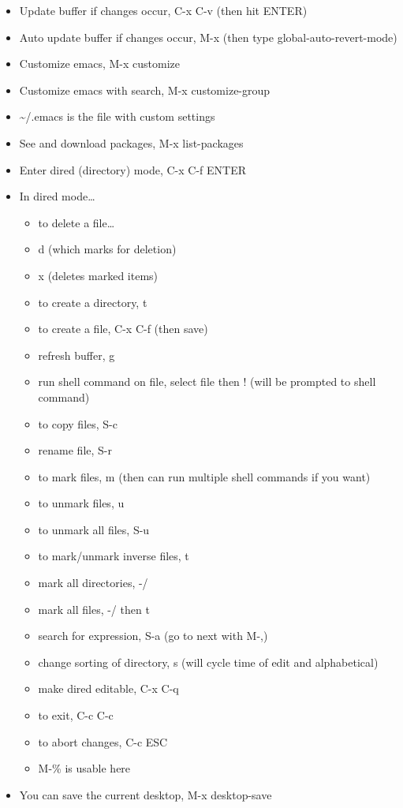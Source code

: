 \documentclass[11pt]{article}
\begin{document}
\begin{itemize}
\item Update buffer if changes occur, C-x C-v (then hit ENTER)
\item Auto update buffer if changes occur, M-x (then type global-auto-revert-mode)
\item Customize emacs, M-x customize
\item Customize emacs with search, M-x customize-group
\item \textasciitilde{}/.emacs is the file with custom settings
\item See and download packages, M-x list-packages
\item Enter dired (directory) mode, C-x C-f ENTER
\item In dired mode\ldots{}
\begin{itemize}
\item to delete a file\ldots{}
\item d (which marks for deletion)
\item x (deletes marked items)
\item to create a directory, t
\item to create a file, C-x C-f (then save)
\item refresh buffer, g
\item run shell command on file, select file then ! (will be prompted to shell command)
\item to copy files, S-c
\item rename file, S-r
\item to mark files, m (then can run multiple shell commands if you want)
\item to unmark files, u
\item to unmark all files, S-u
\item to mark/unmark inverse files, t
\item mark all directories, -/
\item mark all files, -/ then t
\item search for expression, S-a (go to next with M-,)
\item change sorting of directory, s (will cycle time of edit and alphabetical)
\item make dired editable, C-x C-q
\item to exit, C-c C-c
\item to abort changes, C-c ESC
\item M-\% is usable here
\end{itemize}
\item You can save the current desktop, M-x desktop-save

\end{itemize}
\end{document}
